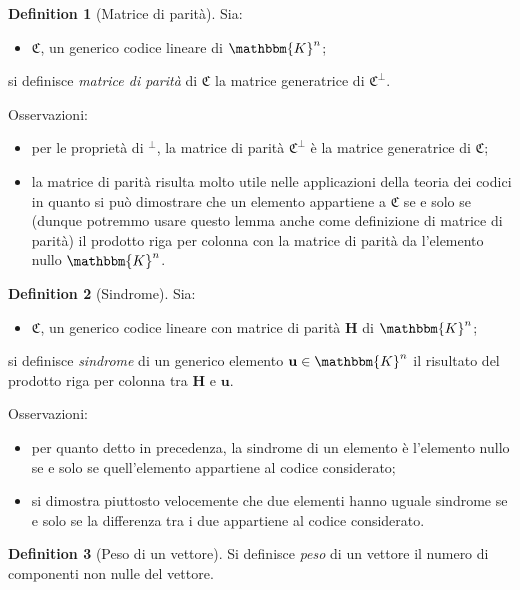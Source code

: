 \documentclass[12pt, a4paper]{report}
\theoremstyle{definition}
\newtheorem{definition}{Definition}[section]
\begin{document}
			\begin{definition}[Matrice di parità]
				Sia:
					\begin{itemize}
						\item $\mathfrak{C}$, un generico codice lineare di $\mathbbm{K}^n$;
					\end{itemize}
				\begin{center}
					si definisce \emph{matrice di parità} di $\mathfrak{C}$ la matrice generatrice di $\mathfrak{C}^\perp$.
				\end{center}
				Osservazioni:
					\begin{itemize}
						\item per le proprietà di $^\bot$, la matrice di parità $\mathfrak{C}^\perp$ è la matrice generatrice di $\mathfrak{C}$;
						\item la matrice di parità risulta molto utile nelle applicazioni della teoria dei codici in quanto si può dimostrare che un elemento appartiene a $\mathfrak{C}$ se e solo se (dunque potremmo usare questo lemma anche come definizione di matrice di parità) il prodotto riga per colonna con la matrice di parità da l’elemento nullo $\mathbbm{K}^n$.
					\end{itemize}
			\end{definition}
			\begin{definition}[Sindrome]
				Sia:
					\begin{itemize}
						\item $\mathfrak{C}$, un generico codice lineare con matrice di parità $\mathbf{H}$ di $\mathbbm{K}^n$;
					\end{itemize}	
				\begin{center}
					si definisce \emph{sindrome} di un generico elemento $\textbf{u}\in\mathbbm{K}^n$ il risultato del prodotto riga per colonna tra $\mathbf{H}$ e $\textbf{u}$.
				\end{center}
				Osservazioni:
					\begin{itemize}
						\item per quanto detto in precedenza, la sindrome di un elemento è l’elemento nullo se e solo se quell’elemento appartiene al codice considerato;
						\item si dimostra piuttosto velocemente che due elementi hanno uguale sindrome se e solo se la differenza tra i due appartiene al codice considerato.
					\end{itemize}
			\end{definition}
			\begin{definition}[Peso di un vettore]
				Si definisce \emph{peso} di un vettore il numero di componenti non nulle del vettore.
			\end{definition}
\end{document}
